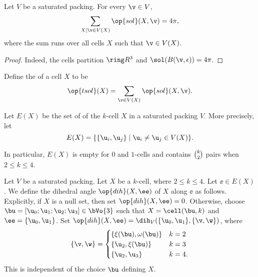 \begin{cnl}
\begin{lemma}
%
Let $V$ be a saturated packing.  For every $\v\in V$, 
\[
\sumfinitepred{X}{\sumvar{X}\v\in \CapV{V}(X)}{\op{sol}(X,\v)} = 4\pi,
\]
where the sum runs over all cells $X$ such that $\v\in \CapV{V}(X)$.
\end{lemma}

\begin{proof} Indeed, the cells partition $\vecR{3}$ and
  $\sol(\openBall{\v}{\epsilon}) = 4\pi$.
\end{proof}

\begin{definition}[$\op{tsol}$]
\label{def:total-solid}
%
Define the  of a cell $X$ to be
\[  
\op{tsol}(X) = \sumfinitepred{\v}{\v \in \CapV{V}(X) }{\op{sol}(X,\v)}.
\] 
\end{definition}


\begin{definition}[edge]
\label{def:edgeX}
%
Let $E(X)$ be the set of  of the $k$-cell $X$
in a saturated packing $V$.  More precisely, let
\[ 
 E(X)=\setcomp{\braced{ \u_i, \u_j}}{ \u_i\ne \u_j\in\CapV{V}( X)}.
\] 
\end{definition}

In particular, $E(X)$ is empty for $0$ and $1$-cells and contains
$\tbinom{k}{2}$ pairs when $2\le k\le 4$.


\begin{definition}[$\op{dih}$]
\label{def:dihX}
%
Let $V$ be a saturated packing.  Let $X$ be a $k$-cell, where $2\le
k\le 4$.  Let $\ee\in E(X)$.  We define the dihedral angle
$\op{dih}(X,\ee)$ of $X$ along $\ee$ as follows.  Explicitly, if $X$
is a null set, then set $\op{dih}(X,\ee)=0$. Otherwise, choose
$\bu=[\u_0;\u_1;\u_2;\u_3]\in \bVo{3}$ such that $X=\cell(\bu,k)$ and
$\ee=\braced{\u_0,\u_1}$.  Set
$\op{dih}(X,\ee)=\dih_V(\braced{\u_0,\u_1},\braced{\v,\w})$, where
\[
\braced{\v,\w} = 
\begin{cases}
  \braced{\xi(\bu),\omega(\bu) } &  k=2\\
  \braced{\u_2,\xi(\bu)} & k=3\\
  \braced{\u_2,\u_3} &k=4.
\end{cases}
\]
This is independent of the choice $\bu$ defining $X$.
\end{definition}


\end{cnl}
